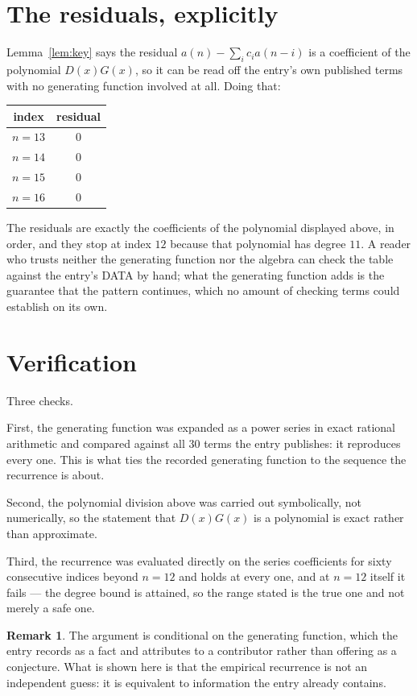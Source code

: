 \documentclass[11pt,a4paper]{article}
\theoremstyle{plain}
\theoremstyle{definition}
\newtheorem{remark}[theorem]{Remark}
\begin{document}
\section{The residuals, explicitly}

Lemma~\ref{lem:key} says the residual $a(n)-\sum_ic_ia(n-i)$ is a coefficient of the
polynomial $D(x)G(x)$, so it can be read off the entry's own published terms with no
generating function involved at all. Doing that:
\begin{center}
\begin{tabular}{cc}
index & residual \\ \hline
$n=13$ & $0$ \\
$n=14$ & $0$ \\
$n=15$ & $0$ \\
$n=16$ & $0$
\end{tabular}
\end{center}
The residuals are exactly the coefficients of the polynomial displayed above, in order, and
they stop at index $12$ because that polynomial has degree $11$. A reader who trusts
neither the generating function nor the algebra can check the table against the entry's DATA
by hand; what the generating function adds is the guarantee that the pattern continues, which
no amount of checking terms could establish on its own.

\section{Verification}

Three checks.

First, the generating function was expanded as a power series in exact rational arithmetic and
compared against all $30$ terms the entry publishes: it reproduces every one. This is
what ties the recorded generating function to the sequence the recurrence is about.

Second, the polynomial division above was carried out symbolically, not numerically, so the
statement that $D(x)G(x)$ is a polynomial is exact rather than approximate.

Third, the recurrence was evaluated directly on the series coefficients for sixty consecutive
indices beyond $n=12$ and holds at every one, and at $n=12$ itself it fails --- the
degree bound is attained, so the range stated is the true one and not merely a safe one.

\begin{remark}
The argument is conditional on the generating function, which the entry records as a fact and
attributes to a contributor rather than offering as a conjecture. What is shown here is that
the empirical recurrence is not an independent guess: it is equivalent to information the
entry already contains.
\end{remark}
\end{document}

